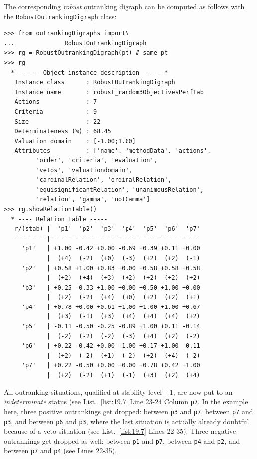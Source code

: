 The corresponding \emph{robust} outranking digraph can be computed as follows with the \texttt{RobustOutrankingDigraph} class:
\begin{lstlisting}[caption={Computing a robust outranking digraph},label=list:19.7]
>>> from outrankingDigraphs import\
...              RobustOutrankingDigraph
>>> rg = RobustOutrankingDigraph(pt) # same pt
>>> rg
  *------- Object instance description ------*
   Instance class      : RobustOutrankingDigraph
   Instance name       : robust_random3ObjectivesPerfTab
   Actions             : 7
   Criteria            : 9
   Size                : 22
   Determinateness (%) : 68.45
   Valuation domain    : [-1.00;1.00]
   Attributes          : ['name', 'methodData', 'actions',
         'order', 'criteria', 'evaluation',
         'vetos', 'valuationdomain',
         'cardinalRelation', 'ordinalRelation',
         'equisignificantRelation', 'unanimousRelation',
         'relation', 'gamma', 'notGamma']
>>> rg.showRelationTable()
  * ---- Relation Table -----
   r/(stab) |  'p1'  'p2'  'p3'  'p4'  'p5'  'p6'  'p7'   
   ---------|------------------------------------------
     'p1'   | +1.00 -0.42 +0.00 -0.69 +0.39 +0.11 +0.00  
            |  (+4)  (-2)  (+0)  (-3)  (+2)  (+2)  (-1)  
     'p2'   | +0.58 +1.00 +0.83 +0.00 +0.58 +0.58 +0.58  
            |  (+2)  (+4)  (+3)  (+2)  (+2)  (+2)  (+2)  
     'p3'   | +0.25 -0.33 +1.00 +0.00 +0.50 +1.00 +0.00  
            |  (+2)  (-2)  (+4)  (+0)  (+2)  (+2)  (+1)  
     'p4'   | +0.78 +0.00 +0.61 +1.00 +1.00 +1.00 +0.67  
            |  (+3)  (-1)  (+3)  (+4)  (+4)  (+4)  (+2)  
     'p5'   | -0.11 -0.50 -0.25 -0.89 +1.00 +0.11 -0.14  
            |  (-2)  (-2)  (-2)  (-3)  (+4)  (+2)  (-2)  
     'p6'   | +0.22 -0.42 +0.00 -1.00 +0.17 +1.00 -0.11  
            |  (+2)  (-2)  (+1)  (-2)  (+2)  (+4)  (-2)  
     'p7'   | +0.22 -0.50 +0.00 +0.00 +0.78 +0.42 +1.00  
            |  (+2)  (-2)  (+1)  (-1)  (+3)  (+2)  (+4)  
\end{lstlisting}

All outranking situations, qualified at stability level $\pm 1$, are now put to an \emph{indeterminate} status (see List.~\ref{list:19.7} Line 23-24 Column \texttt{p7}. In the example here, three positive outrankings get dropped: between \texttt{p3} and \texttt{p7}, between \texttt{p7} and \texttt{p3}, and between \texttt{p6} and \texttt{p3}, where the last situation is actually already doubtful because of a veto situation (see List.~\vref{list:19.7} Lines 22-35). Three negative outrankings get dropped as well: between \texttt{p1} and \texttt{p7}, between \texttt{p4} and \texttt{p2}, and between \texttt{p7} and \texttt{p4} (see Lines 22-35).

